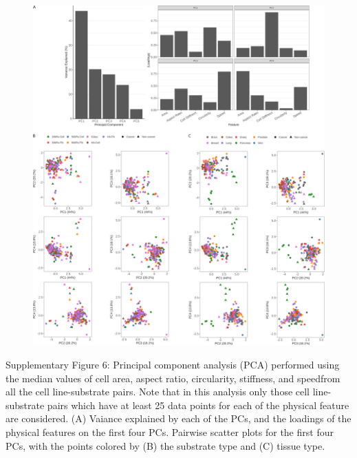 \documentclass[11pt,letterpaper,english,oneside]{article} %
\begin{document}
\begin{figure}[H]
    \hspace*{-2cm}
    \vspace*{2cm}
    \centering
    \includegraphics[scale=0.7]{../Figures/Supplementary_Figure6/supplementary_figure6.png}
    \caption{}
    \label{fig:fig6}
\end{figure}
\begin{adjustwidth}{1cm}{1cm}
  Supplementary Figure 6: Principal component analysis (PCA) performed using the median values of cell area, aspect ratio, circularity, stiffness, and speedfrom all the cell line-substrate pairs.
  Note that in this analysis only those cell line-substrate pairs which have at least 25 data points for each of the physical feature are considered.
  (A) Vaiance explained by each of the PCs, and the loadings of the physical features on the first four PCs.
  Pairwise scatter plots for the first four PCs, with the points colored by (B) the substrate type and (C) tissue type. 
\end{adjustwidth}
\end{document}
